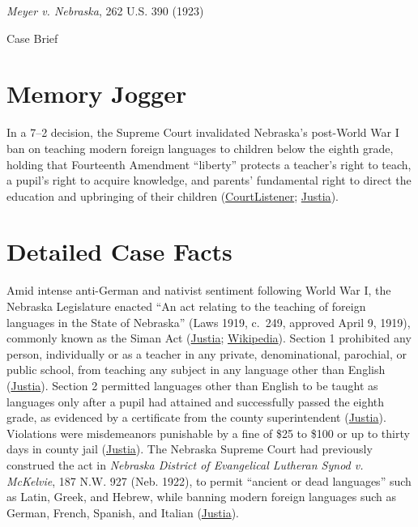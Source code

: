 \documentclass[12pt]{article}
\begin{document}
\begin{center}
{\LARGE \textit{Meyer v. Nebraska}, 262 U.S. 390 (1923)\par}
\vspace{0.8em}
{\large Case Brief\par}
\end{center}
\vspace{1em}

\section{Memory Jogger}

In a 7--2 decision, the Supreme Court invalidated Nebraska's post-World War I ban on teaching modern foreign languages to children below the eighth grade, holding that Fourteenth Amendment ``liberty'' protects a teacher's right to teach, a pupil's right to acquire knowledge, and parents' fundamental right to direct the education and upbringing of their children (\href{https://www.courtlistener.com/opinion/100233/meyer-v-nebraska/}{CourtListener}; \href{https://supreme.justia.com/cases/federal/us/262/390/}{Justia}).

\section{Detailed Case Facts}

Amid intense anti-German and nativist sentiment following World War I, the Nebraska Legislature enacted ``An act relating to the teaching of foreign languages in the State of Nebraska'' (Laws 1919, c.~249, approved April 9, 1919), commonly known as the Siman Act (\href{https://supreme.justia.com/cases/federal/us/262/390/}{Justia}; \href{https://en.wikipedia.org/wiki/Meyer_v._Nebraska}{Wikipedia}). Section 1 prohibited any person, individually or as a teacher in any private, denominational, parochial, or public school, from teaching any subject in any language other than English (\href{https://supreme.justia.com/cases/federal/us/262/390/}{Justia}). Section 2 permitted languages other than English to be taught as languages only after a pupil had attained and successfully passed the eighth grade, as evidenced by a certificate from the county superintendent (\href{https://supreme.justia.com/cases/federal/us/262/390/}{Justia}). Violations were misdemeanors punishable by a fine of \$25 to \$100 or up to thirty days in county jail (\href{https://supreme.justia.com/cases/federal/us/262/390/}{Justia}). The Nebraska Supreme Court had previously construed the act in \textit{Nebraska District of Evangelical Lutheran Synod v. McKelvie}, 187 N.W. 927 (Neb. 1922), to permit ``ancient or dead languages'' such as Latin, Greek, and Hebrew, while banning modern foreign languages such as German, French, Spanish, and Italian (\href{https://supreme.justia.com/cases/federal/us/262/390/}{Justia}).
\end{document}
